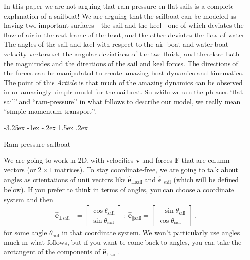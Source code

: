 \documentclass[letterpaper]{article}
\makeatletter
\renewcommand{\vec}[1]{\boldsymbol{#1}}
\newcommand{\uvec}{\vec{\hat{e}}}
\newcommand{\sail}{\text{sail}}
\newcommand{\documentname}{\textsl{Article}}
\renewcommand\section{\@startsection {section}{1}{\z@}%
  {-3.25ex \@plus -1ex \@minus -.2ex}%
  {1.5ex \@plus .2ex}%
  {\raggedright\normalfont\large\bfseries}}
\makeatother
\begin{document}
In this paper we are not arguing that ram pressure on flat sails is a complete explanation of a sailboat!
We are arguing that the sailboat can be modeled as having two important surfaces---the sail and the keel---one of which deviates the flow of air in the rest-frame of the boat, and the other deviates the flow of water.
The angles of the sail and keel with respect to the air--boat and water-boat velocity vectors set the angular deviations of the two fluids, and therefore both the magnitudes and the directions of the sail and keel forces.
The directions of the forces can be manipulated to create amazing boat dynamics and kinematics.
The point of this \documentname{} is that much of the amazing dynamics can be observed in an amazingly simple model for the sailboat.
So while we use the phrases ``flat sail'' and ``ram-pressure'' in what follows to describe our model, we really mean ``simple momentum transport''.

\section{Ram-pressure sailboat}\label{sec:model}

We are going to work in 2D, with velocities $\vec{v}$ and forces $\vec{F}$ that are column vectors (or $2\times 1$ matrices).
To stay coordinate-free, we are going to talk about angles as orientations of unit vectors like $\uvec_{\perp\sail}$ and $\uvec_{\parallel\sail}$ (which will be defined below).
If you prefer to think in terms of angles, you can choose a coordinate system and then
\begin{align}
    \uvec_{\perp\sail} &= \begin{bmatrix}\cos\theta_\sail \\ \sin\theta_\sail\end{bmatrix} ~ ; ~ \uvec_{\parallel\sail} = \begin{bmatrix}-\sin\theta_\sail \\ \cos\theta_\sail\end{bmatrix} ~,
\end{align}
for some angle $\theta_\sail$ in that coordinate system.
We won't particularly use angles much in what follows, but if you want to come back to angles, you can take the arctangent of the components of $\uvec_{\perp\sail}$.
\end{document}
